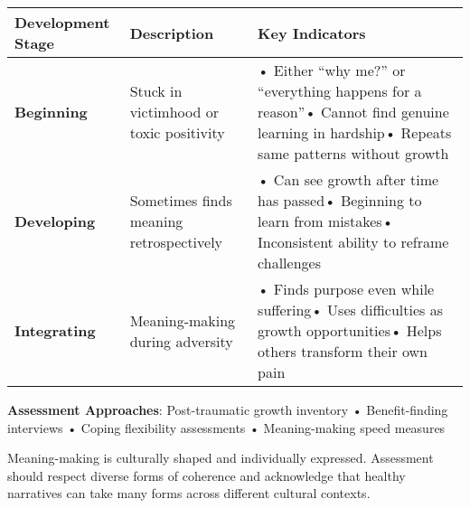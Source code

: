 \documentclass[
  a4paper,
]{report}
\begin{document}
\begin{longtable}[]{@{}
  >{\raggedright\arraybackslash}p{}
  >{\raggedright\arraybackslash}p{}
  >{\raggedright\arraybackslash}p{}@{}}
\toprule\noalign{}
\begin{minipage}[b]{\linewidth}\raggedright
Development Stage
\end{minipage} & \begin{minipage}[b]{\linewidth}\raggedright
Description
\end{minipage} & \begin{minipage}[b]{\linewidth}\raggedright
Key Indicators
\end{minipage} \\
\midrule\noalign{}
\endhead
\bottomrule\noalign{}
\endlastfoot
\textbf{Beginning} & Stuck in victimhood or toxic positivity & • Either
``why me?'' or ``everything happens for a reason''• Cannot find genuine
learning in hardship• Repeats same patterns without growth \\
\textbf{Developing} & Sometimes finds meaning retrospectively & • Can
see growth after time has passed• Beginning to learn from mistakes•
Inconsistent ability to reframe challenges \\
\textbf{Integrating} & Meaning-making during adversity & • Finds purpose
even while suffering• Uses difficulties as growth opportunities• Helps
others transform their own pain \\
\end{longtable}

\textbf{Assessment Approaches}: Post-traumatic growth inventory •
Benefit-finding interviews • Coping flexibility assessments •
Meaning-making speed measures

\begin{tcolorbox}[enhanced jigsaw, toprule=.15mm, rightrule=.15mm, breakable, opacitybacktitle=0.6, colframe=quarto-callout-note-color-frame, colback=white, titlerule=0mm, arc=.35mm, leftrule=.75mm, opacityback=0, colbacktitle=quarto-callout-note-color!10!white, bottomrule=.15mm, coltitle=black, toptitle=1mm, bottomtitle=1mm, title=\textcolor{quarto-callout-note-color}{\faInfo}\hspace{0.5em}{Narrative Note}, left=2mm]

Meaning-making is culturally shaped and individually expressed.
Assessment should respect diverse forms of coherence and acknowledge
that healthy narratives can take many forms across different cultural
contexts.

\end{tcolorbox}
\end{document}
